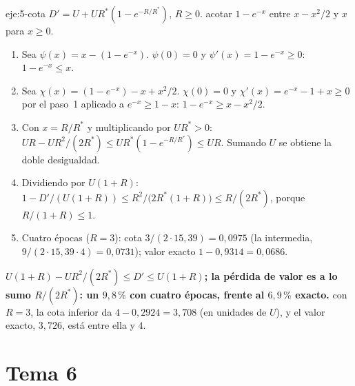 \begin{solucion}{eje:5-cota}
\datos $D'=U+UR^{*}(1-e^{-R/R^{*}})$, $R\ge 0$.
\planteamiento acotar $1-e^{-x}$ entre $x-x^{2}/2$ y $x$ para $x\ge 0$.
\pasos
\begin{enumerate}[label=\arabic*.]
  \item Sea $\psi(x)=x-(1-e^{-x})$. $\psi(0)=0$ y $\psi'(x)=1-e^{-x}\ge 0$: $1-e^{-x}\le x$.
  \item Sea $\chi(x)=(1-e^{-x})-x+x^{2}/2$. $\chi(0)=0$ y $\chi'(x)=e^{-x}-1+x\ge 0$ por el paso~1 aplicado a $e^{-x}\ge 1-x$: $1-e^{-x}\ge x-x^{2}/2$.
  \item Con $x=R/R^{*}$ y multiplicando por $UR^{*}>0$: $UR-UR^{2}/(2R^{*})\le UR^{*}(1-e^{-R/R^{*}})\le UR$. Sumando $U$ se obtiene la doble desigualdad.
  \item Dividiendo por $U(1+R)$: $1-D'/(U(1+R))\le R^{2}/\bigl(2R^{*}(1+R)\bigr)\le R/(2R^{*})$, porque $R/(1+R)\le 1$.
  \item Cuatro épocas ($R=3$): cota $3/(2\cdot 15{,}39)=0{,}0975$ (la intermedia, $9/(2\cdot 15{,}39\cdot 4)=0{,}0731$); valor exacto $1-0{,}9314=0{,}0686$.
\end{enumerate}
\resultado \textbf{$U(1+R)-UR^{2}/(2R^{*})\le D'\le U(1+R)$; la pérdida de valor es a lo sumo $R/(2R^{*})$: un $9{,}8\,\%$ con cuatro épocas, frente al $6{,}9\,\%$ exacto.}
\comprobacion con $R=3$, la cota inferior da $4-0{,}2924=3{,}708$ (en unidades de $U$), y el valor exacto, $3{,}726$, está entre ella y $4$.
\end{solucion}

\section{Tema 6}


